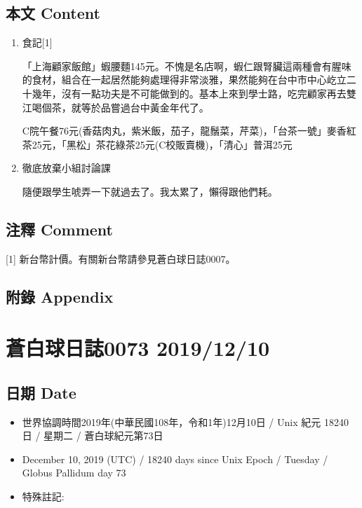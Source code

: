\documentclass[a5paper, 12pt
]{book}
\providecommand{\tightlist}{%
  \setlength{\itemsep}{0pt}\setlength{\parskip}{0pt}}
\begin{document}
\hypertarget{ux672cux6587-content-8}{%
\subsection{本文 Content}\label{ux672cux6587-content-8}}

\begin{enumerate}
\def\labelenumi{\arabic{enumi}.}
\item
  食記{[}1{]}

  「上海顧家飯館」蝦腰麵145元。不愧是名店啊，蝦仁跟腎臟這兩種會有腥味的食材，組合在一起居然能夠處理得非常淡雅，果然能夠在台中市中心屹立二十幾年，沒有一點功夫是不可能做到的。基本上來到學士路，吃完顧家再去雙江喝個茶，就等於品嘗過台中黃金年代了。

  C院午餐76元(香菇肉丸，紫米飯，茄子，龍鬚菜，芹菜)，「台茶一號」麥香紅茶25元，「黑松」茶花綠茶25元(C校販賣機)，「清心」普洱25元
\item
  徹底放棄小組討論課

  隨便跟學生唬弄一下就過去了。我太累了，懶得跟他們耗。
\end{enumerate}

\hypertarget{ux6ce8ux91cb-comment-8}{%
\subsection{注釋 Comment}\label{ux6ce8ux91cb-comment-8}}

{[}1{]} 新台幣計價。有關新台幣請參見蒼白球日誌0007。

\hypertarget{ux9644ux9304-appendix-8}{%
\subsection{附錄 Appendix}\label{ux9644ux9304-appendix-8}}

\hypertarget{ux84bcux767dux7403ux65e5ux8a8c0073-20191210}{%
\section{蒼白球日誌0073
2019/12/10}\label{ux84bcux767dux7403ux65e5ux8a8c0073-20191210}}

\hypertarget{ux65e5ux671f-date-9}{%
\subsection{日期 Date}\label{ux65e5ux671f-date-9}}

\begin{itemize}
\tightlist
\item
  世界協調時間2019年(中華民國108年，令和1年)12月10日 / Unix 紀元 18240
  日 / 星期二 / 蒼白球紀元第73日
\item
  December 10, 2019 (UTC) / 18240 days since Unix Epoch / Tuesday /
  Globus Pallidum day 73
\item
  特殊註記:
\end{itemize}
\end{document}
